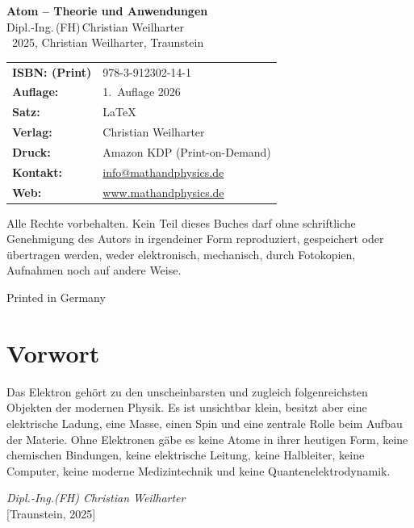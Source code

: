 \cleardoublepage
\thispagestyle{empty}
\begin{center}


{\Large\textbf{Atom – Theorie und Anwendungen}}\\[1.2em]
{\large Dipl.-Ing.\,(FH)\,Christian Weilharter}\\[1.2em]
\textcopyright~2025, Christian Weilharter, Traunstein\\[2em]
\end{center}
\begin{flushleft}
	\begin{tabular}{@{}l l}
	
	
		\textbf{ISBN: (Print)} & 978-3-912302-14-1 \\[0.5em]
		\textbf{Auflage:} & 1.~Auflage 2026 \\[0.5em]
		\textbf{Satz:} & \LaTeX \\[0.5em]
		\textbf{Verlag:} & Christian Weilharter \\[0.5em]
		\textbf{Druck:} & Amazon KDP (Print-on-Demand) \\[0.5em]

		
		\textbf{Kontakt:} & \href{mailto:info@mathandphysics.de}{info@mathandphysics.de}\\[0.5em]
		\textbf{Web:} & \href{https://www.mathandphysics.de}{www.mathandphysics.de}\\
		

	\end{tabular}
\end{flushleft}

\vspace{2em}
\noindent
Alle Rechte vorbehalten. Kein Teil dieses Buches darf ohne schriftliche Genehmigung des Autors 
in irgendeiner Form reproduziert, gespeichert oder übertragen werden, 
weder elektronisch, mechanisch, durch Fotokopien, Aufnahmen noch auf andere Weise.
\begin{center}\small Printed in Germany\end{center}

\cleardoublepage
\chapter*{Vorwort}

Das Elektron gehört zu den unscheinbarsten und zugleich folgenreichsten Objekten der modernen Physik. 
Es ist unsichtbar klein, besitzt aber eine elektrische Ladung, eine Masse, einen Spin und eine zentrale Rolle beim Aufbau der Materie. 
Ohne Elektronen gäbe es keine Atome in ihrer heutigen Form, keine chemischen Bindungen, keine elektrische Leitung, keine Halbleiter, keine Computer, keine moderne Medizintechnik und keine Quantenelektrodynamik.


\begin{flushright}
	\textit{Dipl.-Ing.(FH) Christian Weilharter} \\
	\vspace{0.5em}
	[Traunstein, 2025]
\end{flushright}



